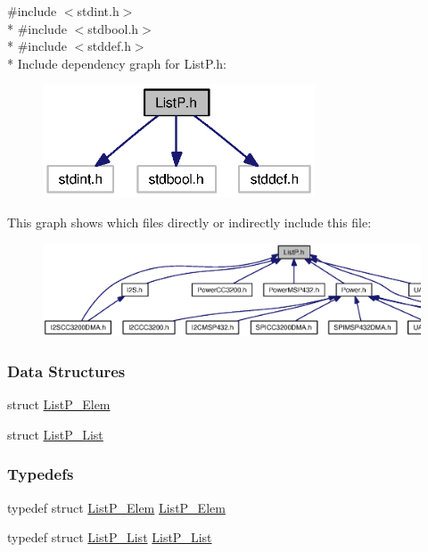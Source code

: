 {\ttfamily \#include $<$stdint.\+h$>$}\\*
{\ttfamily \#include $<$stdbool.\+h$>$}\\*
{\ttfamily \#include $<$stddef.\+h$>$}\\*
Include dependency graph for List\+P.\+h\+:
\nopagebreak
\begin{figure}[H]
\begin{center}
\leavevmode
\includegraphics[width=229pt]{_list_p_8h__incl}
\end{center}
\end{figure}
This graph shows which files directly or indirectly include this file\+:
\nopagebreak
\begin{figure}[H]
\begin{center}
\leavevmode
\includegraphics[width=350pt]{_list_p_8h__dep__incl}
\end{center}
\end{figure}
\subsubsection*{Data Structures}
\begin{DoxyCompactItemize}
\item 
struct \hyperlink{struct_list_p___elem}{List\+P\+\_\+\+Elem}
\item 
struct \hyperlink{struct_list_p___list}{List\+P\+\_\+\+List}
\end{DoxyCompactItemize}
\subsubsection*{Typedefs}
\begin{DoxyCompactItemize}
\item 
typedef struct \hyperlink{struct_list_p___elem}{List\+P\+\_\+\+Elem} \hyperlink{_list_p_8h_a836920a2438eb9d698a5d9a917cefdd4}{List\+P\+\_\+\+Elem}
\item 
typedef struct \hyperlink{struct_list_p___list}{List\+P\+\_\+\+List} \hyperlink{_list_p_8h_a7b0d006edcc0a69c7da886463ee49a48}{List\+P\+\_\+\+List}
\end{DoxyCompactItemize}
